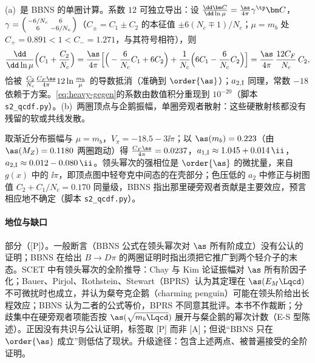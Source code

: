 \begin{proofsketch}
(a)~是 BBNS 的单圈计算\cite[式~(46)--(48)]{BenekeEtAl2001}。系数 $12$ 可独立导出：设 $\frac{\dd\bm C}{\dd\ln\mu}=\frac{\as}{4\pi}\gamma^{\tp}\bm C$，$\gamma=\begin{psmallmatrix}-6/N_c&6\\6&-6/N_c\end{psmallmatrix}$（$C_\pm=C_1\pm C_2$ 的本征值 $\pm6(N_c\mp1)/N_c$；$\mu=m_b$ 处 $C_+=0.891<1<C_-=1.271$，与其符号相符），则
\begin{equation}\label{eq:heavy-a1-rg}
\frac{\dd}{\dd\ln\mu}\Big(C_1+\frac{C_2}{N_c}\Big)=\frac{\as}{4\pi}\Big[\Big(-\frac{6}{N_c}C_1+6C_2\Big)+\frac1{N_c}\Big(6C_1-\frac6{N_c}C_2\Big)\Big]=\frac{\as}{4\pi}\,\frac{12C_F}{N_c}\,C_2 ,
\end{equation}
恰被 $\frac{C_2}{N_c}\frac{C_F\as}{4\pi}12\ln\frac{m_b}{\mu}$ 的导数抵消（准确到 $\order{\as}$）；$a_{2,\rm I}$ 同理，常数 $-18$ 依赖于方案。\cref{eq:heavy-gegen}的系数由数值积分重现到 $10^{-20}$（脚本 \texttt{s2\_\allowbreak qcdf.py}）。(b)~两圈顶点\cite{Bell:2007tv,Bell:2009nk,Beneke:2009ek}与企鹅振幅\cite{Bell:2015koa,Bell:2020qus}，单圈旁观者散射\cite{Beneke:2005vv,Beneke:2006mk,Kivel:2006xc,Pilipp:2007mg,Beneke:2005gs}：这些硬散射核都没有残留的软或共线发散。
\end{proofsketch}

\begin{example}[顶点修正与微扰强相位]\label{ex:heavy-vertex}
取渐近分布振幅与 $\mu=m_b$，$V_\pi=-18.5-3\ii\pi$；以 $\as(m_b)=0.223$（由 $\as(M_Z)=0.1180$ 两圈跑动）得 $\frac{C_F\as}{4\pi}=0.0237$，$a_{1,\rm I}\approx1.045+0.014\,\ii$，$a_{2,\rm I}\approx0.012-0.080\,\ii$。领头幂次的强相位是 $\order{\as}$ 的微扰量，来自 $g(x)$ 中的 $\ii\pi$，即顶点图中轻夸克中间态的在壳部分；色压低的 $a_2$ 中修正与树图值 $C_2+C_1/N_c=0.170$ 同量级，BBNS 指出那里硬旁观者贡献是主要效应，预言相应地不确定\cite[第~4.2~节]{BenekeEtAl2001}（脚本 \texttt{s2\_\allowbreak qcdf.py}）。
\end{example}

\paragraph{地位与缺口}
部分（[P]）。一般断言（BBNS 公式在领头幂次对 $\as$ 所有阶成立）没有公认的证明；BBNS 在给出 $B\to D\pi$ 的两圈证明时指出须把它推广到两个轻介子的末态\cite[第~8~节]{BenekeEtAl2000}。SCET 中有领头幂次的全阶推导：Chay 与 Kim 论证振幅对 $\as$ 所有阶因子化\cite{Chay:2003ju}；Bauer、Pirjol、Rothstein、Stewart（BPRS）认为其定理在 $\as(E_M\Lqcd)$ 不可微扰时也成立，并认为粲夸克企鹅（charming penguin）可能在领头阶给出长程效应\cite{Bauer:2004tj}；BBNS 认为二者的公式等价\cite{Beneke:2004bn}，BPRS 不同意其批评\cite{Bauer:2005wb}。本书不作裁断；分歧集中在硬旁观者项能否按 $\as(\sqrt{m_b\Lqcd})$ 展开与粲企鹅的幂次计数（E-S 型陈述）。正因没有共识与公认证明，标签取 [P] 而非 [A]；但说“BBNS 只在 $\order{\as}$ 成立”则低估了现状。升级途径：包含上述两点、被普遍接受的全阶证明。

